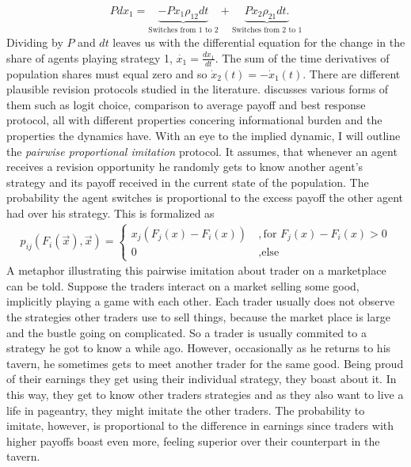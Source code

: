 \documentclass[11pt]{article}
\begin{document}
\begin{align} 
        Pdx_1 =  \underbrace{-Px_1 \rho_{12}dt}_{\text{Switches from 1 to 2}} 
        + \underbrace{Px_2 \rho_{21}dt.}_{\text{Switches from 2 to 1}}
\end{align}
Dividing by $P$ and $dt$ leaves us with the differential equation for
the change in the share of agents playing strategy 1, 
$\dot{x_1} =\frac{dx_1}{dt}$. 
The sum of the time derivatives of population shares must equal zero and so
$\dot{x}_2(t) =- \dot{x}_1(t)$.
There are different plausible revision protocols studied in the literature. 
\textcite[128,129,178]{sandholm_population_2010} discusses various forms of 
them such as logit choice, comparison to average payoff and best response 
protocol, all with different properties concering informational burden and the
properties the dynamics have. With an eye to the implied dynamic, I will
outline the \textit{pairwise proportional imitation} protocol. 
It assumes, that whenever an
agent receives a revision opportunity he randomly gets to know another agent's
strategy and its payoff received in the current state of the population. 
The probability the agent switches is proportional to the excess payoff the 
other agent had over his strategy. This is formalized as 
\begin{align}
        \label{eq:pairwiseproportionalimitation}
        p_{ij}(F_i(\vec{x}),\vec{x}) =
                \begin{cases}
                        x_j(F_j(x) -F_i(x)) &\ , \text{for } F_j(x) - F_i(x) > 0 \\
                        0 &\ , \text{else}
                \end{cases}
\end{align}
A metaphor illustrating this pairwise imitation about trader on a marketplace
can be told. Suppose the traders interact on a market selling some 
good, implicitly playing a game with each other. Each trader usually does not
observe the strategies other traders use to sell things, because the market
place is large and the bustle going on complicated. 
So a trader is usually commited to a strategy he got to know a while ago.
However, occasionally as he returns to his tavern, he sometimes gets to meet 
another trader for the same good. Being proud of their earnings they get using
their individual strategy, they boast about it. In this way, they get to know
other traders strategies and as they also want to live a life in pageantry,
they might imitate the other traders. The probability to imitate, however, is
proportional to the difference in earnings since traders with higher payoffs 
boast even more, feeling superior over their counterpart in the tavern.
\end{document}
